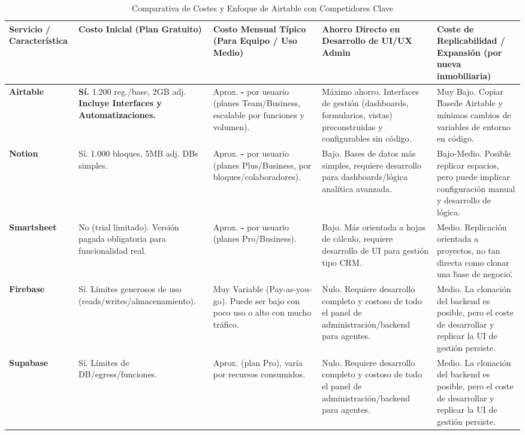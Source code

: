 \begin{enumerate}
    \begin{table}[H]
        \centering
        \footnotesize
        \setlength{\tabcolsep}{4pt}
        \begin{tabular}{|>{\columncolor{tealblue}}p{}|p{}|p{}|p{}|p{}|}
        \hline
        \rowcolor{tealblue}
        \textbf{Servicio / Característica} & \textbf{Costo Inicial (Plan Gratuito)} & \textbf{Costo Mensual Típico (Para Equipo / Uso Medio)} & \textbf{Ahorro Directo en Desarrollo de UI/UX Admin} & \textbf{Coste de Replicabilidad / Expansión (por nueva inmobiliaria)} \\
        \hline
        \textbf{Airtable} & \textbf{Sí.} 1.200 reg./base, 2GB adj. \textbf{Incluye Interfaces y Automatizaciones.} & Aprox. \textbf{\textdollar20-\textdollar45} por usuario (planes Team/Business, escalable por funciones y volumen). & Máximo ahorro. Interfaces de gestión (dashboards, formularios, vistas) preconstruidas y configurables sin código. & Muy Bajo. Copiar \"Base\" de Airtable y mínimos cambios de variables de entorno en código. \\
        \hline
        \textbf{Notion} & Sí. 1.000 bloques, 5MB adj. DBs simples. & Aprox. \textbf{\textdollar8-\textdollar15} por usuario (planes Plus/Business, por bloques/colaboradores). & Bajo. Bases de datos más simples, requiere desarrollo para dashboards/lógica analítica avanzada. & Bajo-Medio. Posible replicar espacios, pero puede implicar configuración manual y desarrollo de lógica. \\
        \hline
        \textbf{Smartsheet} & No (trial limitado). Versión pagada obligatoria para funcionalidad real. & Aprox. \textbf{\textdollar7-\textdollar25} por usuario (planes Pro/Business). & Bajo. Más orientada a hojas de cálculo, requiere desarrollo de UI para gestión tipo CRM. & Medio. Replicación orientada a proyectos, no tan directa como clonar una \"base de negocio\". \\
        \hline
        \textbf{Firebase} & Sí. Límites generosos de uso (reads/writes/almacenamiento). & Muy Variable (Pay-as-you-go). Puede ser bajo con poco uso o alto con mucho tráfico. & Nulo. Requiere desarrollo completo y costoso de todo el panel de administración/backend para agentes. & Medio. La clonación del backend es posible, pero el coste de desarrollar y replicar la UI de gestión persiste. \\
        \hline
        \textbf{Supabase} & Sí. Límites de DB/egress/funciones. & Aprox. \textbf{\textdollar25} (plan Pro), varía por recursos consumidos. & Nulo. Requiere desarrollo completo y costoso de todo el panel de administración/backend para agentes. & Medio. La clonación del backend es posible, pero el coste de desarrollar y replicar la UI de gestión persiste. \\
        \hline
        \end{tabular}
        \caption{Comparativa de Costes y Enfoque de Airtable con Competidores Clave}
    \end{table}


\end{enumerate}
